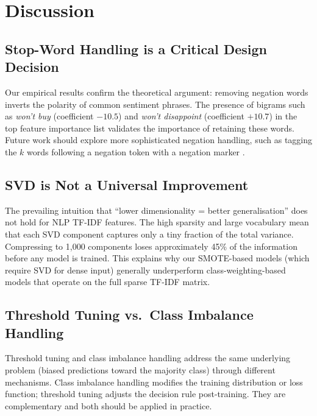 \documentclass[11pt,a4paper]{article}
\begin{document}
\section{Discussion}
\label{sec:discussion}

\subsection{Stop-Word Handling is a Critical Design Decision}

Our empirical results confirm the theoretical argument: removing negation
words inverts the polarity of common sentiment phrases.
The presence of bigrams such as \textit{won't buy} (coefficient $-10.5$)
and \textit{won't disappoint} (coefficient $+10.7$) in the top feature
importance list validates the importance of retaining these words.
Future work should explore more sophisticated negation handling,
such as tagging the $k$ words following a negation token with a negation
marker \citep{pang2002thumbs}.

\subsection{SVD is Not a Universal Improvement}

The prevailing intuition that ``lower dimensionality = better generalisation''
does not hold for NLP TF-IDF features.
The high sparsity and large vocabulary mean that each SVD component captures
only a tiny fraction of the total variance.
Compressing to 1,000 components loses approximately 45\% of the information
before any model is trained.
This explains why our SMOTE-based models (which require SVD for dense input)
generally underperform class-weighting-based models that operate on the
full sparse TF-IDF matrix.

\subsection{Threshold Tuning vs.\ Class Imbalance Handling}

Threshold tuning and class imbalance handling address the same underlying
problem (biased predictions toward the majority class) through different
mechanisms.
Class imbalance handling modifies the training distribution or loss function;
threshold tuning adjusts the decision rule post-training.
They are complementary and both should be applied in practice.
\end{document}
